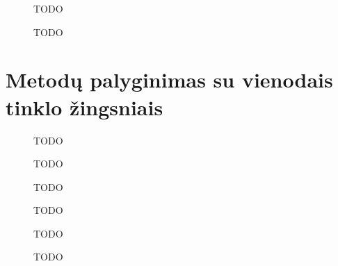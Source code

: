 \documentclass[]{VUMIFTemplateClass}
\begin{document}
\begin{figure}
    \begin{center}
        
    \end{center}
    \caption{TODO}
\end{figure}

\begin{figure}
    \begin{center}
        
    \end{center}
    \caption{TODO}
\end{figure}

\section{Metodų palyginimas su vienodais tinklo žingsniais}

\begin{figure}
    \begin{center}
        
    \end{center}
    \caption{TODO}
\end{figure}

\begin{figure}
    \begin{center}
        
    \end{center}
    \caption{TODO}
\end{figure}

\begin{figure}
    \begin{center}
        
    \end{center}
    \caption{TODO}
\end{figure}

\begin{figure}
    \begin{center}
        
    \end{center}
    \caption{TODO}
\end{figure}

\begin{figure}
    \begin{center}
        
    \end{center}
    \caption{TODO}
\end{figure}

\begin{figure}
    \begin{center}
        
    \end{center}
    \caption{TODO}
\end{figure}
\end{document}
